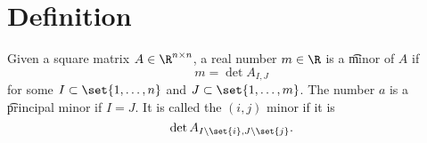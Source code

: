 

\section*{Definition}

Given a square matrix $A \in \R ^{n \times  n}$, a real number $m \in \R $ is a \t{minor} of $A$ if
\[
m = \det A_{I, J}
\]
for some $I \subset \set{1, \dots , n}$ and $J \subset \set{1, \dots , m}$.
The number $a$ is a \t{principal minor} if $I = J$.
It is called the \t{$(i,j)$ minor} if it is
\[
\det A_{{I \setminus \set{i}, J \setminus \set{j}}}.
\]

\blankpage